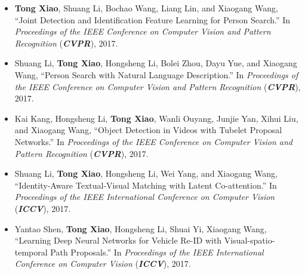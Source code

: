 \begin{itemize}
  \item \textbf{Tong Xiao}, Shuang Li, Bochao Wang, Liang Lin, and Xiaogang Wang, ``Joint Detection and Identification Feature Learning for Person Search.'' In \textit{Proceedings of the IEEE Conference on Computer Vision and Pattern Recognition} (\textit{\textbf{CVPR}}), 2017.

  \item Shuang Li, \textbf{Tong Xiao}, Hongsheng Li, Bolei Zhou, Dayu Yue, and Xiaogang Wang, ``Person Search with Natural Language Description.'' In \textit{Proceedings of the IEEE Conference on Computer Vision and Pattern Recognition} (\textit{\textbf{CVPR}}), 2017.

  \item Kai Kang, Hongsheng Li, \textbf{Tong Xiao}, Wanli Ouyang, Junjie Yan, Xihui Liu, and Xiaogang Wang, ``Object Detection in Videos with Tubelet Proposal Networks.'' In \textit{Proceedings of the IEEE Conference on Computer Vision and Pattern Recognition} (\textit{\textbf{CVPR}}), 2017.

  \item Shuang Li, \textbf{Tong Xiao}, Hongsheng Li, Wei Yang, and Xiaogang Wang, ``Identity-Aware Textual-Visual Matching with Latent Co-attention.'' In \textit{Proceedings of the IEEE International Conference on Computer Vision} (\textit{\textbf{ICCV}}), 2017.

  \item Yantao Shen, \textbf{Tong Xiao}, Hongsheng Li, Shuai Yi, Xiaogang Wang, ``Learning Deep Neural Networks for Vehicle Re-ID with Visual-spatio-temporal Path Proposals.'' In \textit{Proceedings of the IEEE International Conference on Computer Vision} (\textit{\textbf{ICCV}}), 2017.

\end{itemize}
